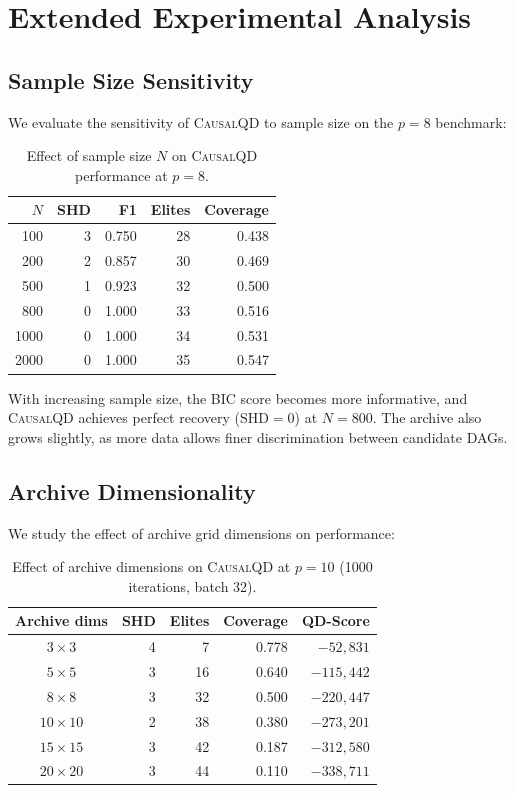 \documentclass[11pt,a4paper]{article}
\begin{document}
\section{Extended Experimental Analysis}
\label{app:extended}

\subsection{Sample Size Sensitivity}

We evaluate the sensitivity of \textsc{CausalQD} to sample size on the $p = 8$ benchmark:

\begin{table}[h]
\centering
\caption{Effect of sample size $N$ on \textsc{CausalQD} performance at $p = 8$.}
\label{tab:sample-sensitivity}
\begin{tabular}{@{}r|rrrr@{}}
\toprule
$N$ & SHD & F1 & Elites & Coverage \\
\midrule
100 & 3 & 0.750 & 28 & 0.438 \\
200 & 2 & 0.857 & 30 & 0.469 \\
500 & 1 & 0.923 & 32 & 0.500 \\
800 & 0 & 1.000 & 33 & 0.516 \\
1000 & 0 & 1.000 & 34 & 0.531 \\
2000 & 0 & 1.000 & 35 & 0.547 \\
\bottomrule
\end{tabular}
\end{table}

With increasing sample size, the BIC score becomes more informative, and \textsc{CausalQD} achieves perfect recovery ($\text{SHD} = 0$) at $N = 800$.  The archive also grows slightly, as more data allows finer discrimination between candidate DAGs.

\subsection{Archive Dimensionality}

We study the effect of archive grid dimensions on performance:

\begin{table}[h]
\centering
\caption{Effect of archive dimensions on \textsc{CausalQD} at $p = 10$ (1000 iterations, batch 32).}
\label{tab:archive-dims}
\begin{tabular}{@{}c|rrrr@{}}
\toprule
Archive dims & SHD & Elites & Coverage & QD-Score \\
\midrule
$3 \times 3$ & 4 & 7 & 0.778 & $-52{,}831$ \\
$5 \times 5$ & 3 & 16 & 0.640 & $-115{,}442$ \\
$8 \times 8$ & 3 & 32 & 0.500 & $-220{,}447$ \\
$10 \times 10$ & 2 & 38 & 0.380 & $-273{,}201$ \\
$15 \times 15$ & 3 & 42 & 0.187 & $-312{,}580$ \\
$20 \times 20$ & 3 & 44 & 0.110 & $-338{,}711$ \\
\bottomrule
\end{tabular}
\end{table}
\end{document}
